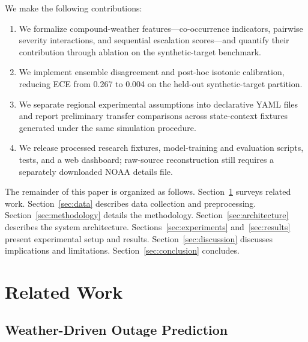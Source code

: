 \documentclass[conference]{IEEEtran}
\begin{document}
We make the following contributions:
\begin{enumerate}
    \item We formalize compound-weather features---co-occurrence indicators, pairwise severity interactions, and sequential escalation scores---and quantify their contribution through ablation on the synthetic-target benchmark.
    \item We implement ensemble disagreement and post-hoc isotonic calibration, reducing ECE from 0.267 to 0.004 on the held-out synthetic-target partition.
    \item We separate regional experimental assumptions into declarative YAML files and report preliminary transfer comparisons across state-context fixtures generated under the same simulation procedure.
    \item We release processed research fixtures, model-training and evaluation scripts, tests, and a web dashboard; raw-source reconstruction still requires a separately downloaded NOAA details file.
\end{enumerate}

The remainder of this paper is organized as follows. Section~\ref{sec:related} surveys related work. Section~\ref{sec:data} describes data collection and preprocessing. Section~\ref{sec:methodology} details the methodology. Section~\ref{sec:architecture} describes the system architecture. Sections~\ref{sec:experiments} and~\ref{sec:results} present experimental setup and results. Section~\ref{sec:discussion} discusses implications and limitations. Section~\ref{sec:conclusion} concludes.

\section{Related Work}\label{sec:related}

\subsection{Weather-Driven Outage Prediction}
\end{document}
